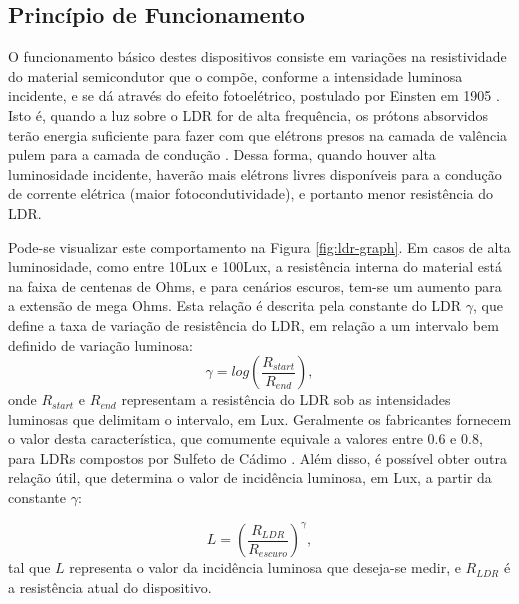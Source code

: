 \documentclass[oneside,openright,12pt]{ufsm_2015} %
\begin{document}
\subsection{Princípio de Funcionamento}
O funcionamento básico destes dispositivos consiste em variações na resistividade do material semicondutor que o compõe, conforme a intensidade luminosa incidente, e se dá através do efeito fotoelétrico,  postulado por Einsten em 1905 \cite{klassen2011photoelectric}. Isto é, quando a luz sobre o LDR for de alta frequência, os prótons absorvidos terão energia suficiente para fazer com que elétrons presos na camada de valência pulem para a camada de condução \cite{ibrahim2016automated}. Dessa forma, quando houver alta luminosidade incidente, haverão mais elétrons livres disponíveis para a condução de corrente elétrica (maior fotocondutividade), e portanto menor resistência do LDR.

Pode-se visualizar este comportamento na Figura \ref{fig:ldr-graph}. Em casos de alta luminosidade, como entre 10Lux e 100Lux, a resistência interna do material está na faixa de centenas de Ohms, e para cenários escuros, tem-se um aumento para a extensão de mega Ohms. Esta relação é descrita pela constante do LDR $\gamma$, que define a taxa de variação de resistência do LDR, em relação a um intervalo bem definido de variação luminosa:
\begin{equation}
    \gamma = log(\frac {R_{start}}{R_{end}}),
\end{equation}
onde $R_{start}$ e $R_{end}$ representam a resistência do LDR sob as intensidades luminosas que delimitam o intervalo, em Lux. Geralmente os fabricantes fornecem o valor desta característica, que comumente equivale a valores entre 0.6 e 0.8, para LDRs compostos por Sulfeto de Cádimo \cite{Lightdep67:online}. Além disso, é possível obter outra relação útil, que determina o valor de incidência luminosa, em Lux, a partir da constante $\gamma$:

\begin{equation}
    L = (\frac{R_{LDR}}{R_{escuro}})^\gamma ,
\end{equation}
tal que $L$ representa o valor da incidência luminosa que deseja-se medir, e $R_{LDR}$ é a resistência atual do dispositivo.
\end{document}
